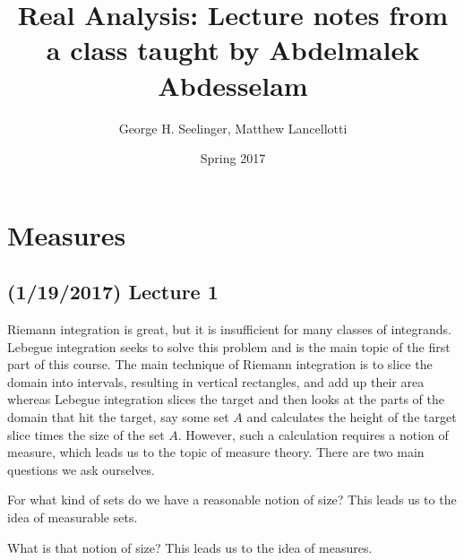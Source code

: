 \documentclass[11pt,leqno,oneside]{amsbook}
\title[Real Analysis]{Real Analysis: Lecture notes from a class taught by Abdelmalek Abdesselam}
\author{George H. Seelinger, Matthew Lancellotti}
\date{Spring 2017}
\numberwithin{thm}{section}
\begin{document}
\maketitle
\setcounter{tocdepth}{1}
\tableofcontents
\section{Measures}
\subsection*{(1/19/2017) Lecture 1}
Riemann integration is great, but it is insufficient for many classes
of integrands. Lebegue integration seeks to solve this problem and is
the main topic of the first part of this course. The main technique of
Riemann integration is to slice the domain into intervals, resulting in vertical rectangles, and add up
their area whereas Lebegue integration slices the target and then
looks at the parts of the domain that hit the target, say some set $A$
and calculates the height of the target slice times the size of the set
$A$. However, such a calculation requires a notion of measure, which
leads us to the topic of measure theory. There are two main questions
we ask ourselves.
\begin{thm}[Question]
  For what kind of sets do we have a reasonable notion of size? This
  leads us to the idea of measurable sets.
\end{thm}
\begin{thm}[Question]
  What is that notion of size? This leads us to the idea of measures.
\end{thm}
\end{document}
